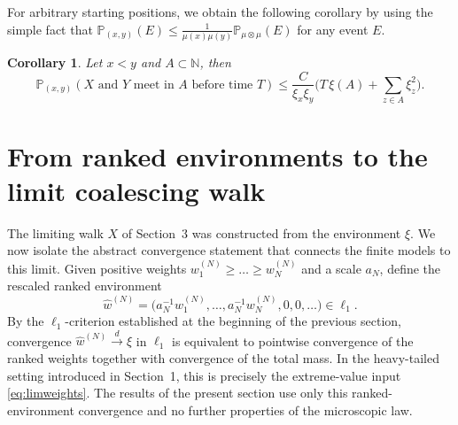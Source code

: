\documentclass[11pt,a4paper]{scrartcl}
\numberwithin{equation}{section}
\theoremstyle{plain}
\newtheorem{corollary}[theorem]{Corollary}
\theoremstyle{definition}
\theoremstyle{remark}
\newcommand{\bN}{\ensuremath{\mathbb{N}}}
\newcommand{\bP}{\ensuremath{\mathbb{P}}}
\newcommand{\cG}{\ensuremath{\mathcal{G}}}
\newcommand{\abs}[1]{\left\vert \, #1 \, \right\vert}
\newcommand{\randnotiz}[1]
{{\hfuzz=7.002pt
\marginline{\hfuzz=7.002pt
\fbox{\hfuzz=7.002pt
\parbox{2.3cm}{\hfuzz=7.002pt \small\centering#1}
}}
}}
\newcommand{\hP}{\widehat{\bP}}
\begin{document}
For arbitrary starting positions, we obtain the following corollary by using the simple fact that $\bP_{(x,y)}(E)\leq \frac{1}{\mu(x)\mu(y)} {\bP_{\mu\otimes\mu}}(E)$ for any event $E$.

\begin{corollary}\label{cor:meetingbound}
Let $x<y$ and $A\subset \bN$, then
$$\bP_{(x,y)}(X \text{ and } Y \text{ meet in } A \text{ before time }T)\leq \frac{C}{\xi_x\xi_y}\big(T \,\xi(A)  +{\sum_{z\in A}\xi_z^2}\big).$$
\end{corollary}


%
%
%



\section{From ranked environments to the limit coalescing walk}
The limiting walk $X$ of Section~3 was constructed from the environment $\xi$. We now isolate the abstract convergence statement that connects the finite models to this limit. Given positive weights $w_1^{(N)}\geq\dots\geq w_N^{(N)}$ and a scale $a_N$, define the rescaled ranked environment
\[
\widehat{w}^{(N)}=\big(a_N^{-1}w_1^{(N)},\dots,a_N^{-1}w_N^{(N)},0,0,\dots\big)\in \ell_1.
\]
By the $\ell_1$-criterion established at the beginning of the previous section, convergence $\widehat{w}^{(N)}\overset{d}{\to}\xi$ in $\ell_1$ is equivalent to pointwise convergence of the ranked weights together with convergence of the total mass. In the heavy-tailed setting introduced in Section~1, this is precisely the extreme-value input \eqref{eq:limweights}. The results of the present section use only this ranked-environment convergence and no further properties of the microscopic law.
\end{document}
